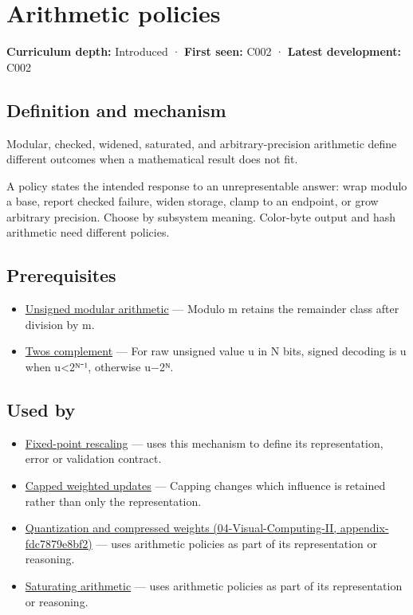 \hypertarget{appendix-2ed044358b82}{}
\section{Arithmetic policies}\label{appendix-2ed044358b82-arithmetic-policies}

\textbf{Curriculum depth:} Introduced · \textbf{First seen:} C002 · \textbf{Latest development:} C002

\subsection{Definition and mechanism}\label{appendix-2ed044358b82-definition-and-mechanism}

Modular, checked, widened, saturated, and arbitrary-precision arithmetic define different outcomes when a mathematical result does not fit.

A policy states the intended response to an unrepresentable answer: wrap modulo a base, report checked failure, widen storage, clamp to an endpoint, or grow arbitrary precision. Choose by subsystem meaning. Color-byte output and hash arithmetic need different policies.

\subsection{Prerequisites}\label{appendix-2ed044358b82-prerequisites}

\begin{itemize}
\tightlist
\item
  \hyperref[appendix-c99977d88b33]{Unsigned modular arithmetic} --- Modulo m retains the remainder class after division by m.
\item
  \hyperref[appendix-4fbc03d20829]{Two\textquotesingle s complement} --- For raw unsigned value u in N bits, signed decoding is u when u\textless2ᴺ⁻¹, otherwise u−2ᴺ.
\end{itemize}

\subsection{Used by}\label{appendix-2ed044358b82-used-by}

\begin{itemize}
\item
  \hyperref[appendix-3333db47830f]{Fixed-point rescaling} --- uses this mechanism to define its representation, error or validation contract.
\item
  \hyperref[appendix-1e45d0613db3]{Capped weighted updates} --- Capping changes which influence is retained rather than only the representation.
\item
  \href{../04-Visual-Computing-II/main.pdf\#nameddest=appendix-fdc7879e8bf2}{Quantization and compressed weights (04-Visual-Computing-II, appendix-fdc7879e8bf2)} --- uses arithmetic policies as part of its representation or reasoning.
\item
  \hyperref[appendix-3999c6209649]{Saturating arithmetic} --- uses arithmetic policies as part of its representation or reasoning.
\end{itemize}

